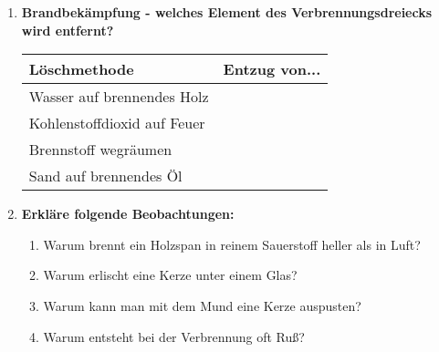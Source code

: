 \begin{enumerate}[label=\arabic*.]
    \vspace{1cm}

    \item \textbf{Brandbekämpfung - welches Element des Verbrennungsdreiecks wird entfernt?}
    \vspace{0.5cm}

    \begin{tabular}{|p{5cm}|p{6cm}|}
        \hline
        \textbf{Löschmethode} & \textbf{Entzug von...} \\
        \hline
        Wasser auf brennendes Holz & \\
        \hline
        Kohlenstoffdioxid auf Feuer & \\
        \hline
        Brennstoff wegräumen & \\
        \hline
        Sand auf brennendes Öl & \\
        \hline
    \end{tabular}

    \vspace{1cm}

    \item \textbf{Erkläre folgende Beobachtungen:}
    \vspace{0.5cm}

    \begin{enumerate}[label=\alph*)]
        \item Warum brennt ein Holzspan in reinem Sauerstoff heller als in Luft?
        \vspace{2cm}

        \item Warum erlischt eine Kerze unter einem Glas?
        \vspace{2cm}

        \item Warum kann man mit dem Mund eine Kerze auspusten?
        \vspace{2cm}

        \item Warum entsteht bei der Verbrennung oft Ruß?
        \vspace{2cm}
    \end{enumerate}

\end{enumerate}